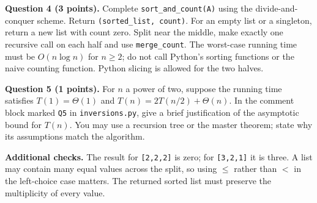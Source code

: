 \documentclass[11pt,a4paper]{article}
\newcommand{\code}[1]{\texttt{#1}}
\newcommand{\q}[2]{\medskip\noindent\textbf{Question #1 (#2 points).} }
\begin{document}
\q{4}{3} Complete \code{sort\_and\_count(A)} using the divide-and-conquer scheme. Return \code{(sorted\_list, count)}. For an empty list or a singleton, return a new list with count zero. Split near the middle, make exactly one recursive call on each half and use \code{merge\_count}. The worst-case running time must be \(O(n\log n)\) for \(n\ge2\); do not call Python's sorting functions or the naive counting function. Python slicing is allowed for the two halves.

\q{5}{1} For \(n\) a power of two, suppose the running time satisfies \(T(1)=\Theta(1)\) and \(T(n)=2T(n/2)+\Theta(n)\). In the comment block marked \code{Q5} in \code{inversions.py}, give a brief justification of the asymptotic bound for \(T(n)\). You may use a recursion tree or the master theorem; state why its assumptions match the algorithm.

\textbf{Additional checks.} The result for \code{[2,2,2]} is zero; for \code{[3,2,1]} it is three. A list may contain many equal values across the split, so using \(\le\) rather than \(<\) in the left-choice case matters. The returned sorted list must preserve the multiplicity of every value.
\end{document}
